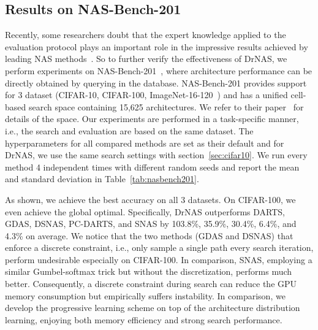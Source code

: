 \documentclass{article} \usepackage{iclr2021_conference,times}
\begin{document}
\subsection{Results on NAS-Bench-201}
\label{sec:201}
Recently, some researchers doubt that the expert knowledge applied to the evaluation protocol plays an important role in the impressive results achieved by leading NAS methods~\citep{HardEvaluation, randomnas}.
So to further verify the effectiveness of DrNAS, we perform experiments on NAS-Bench-201~\citep{nasbench201}, 
where architecture performance can be directly obtained by querying in the database.
NAS-Bench-201 provides support for 3 dataset (CIFAR-10, CIFAR-100, ImageNet-16-120~\citep{imagenet16}) and has a unified cell-based search space containing 15,625 architectures. 
We refer to their paper~\citep{nasbench201} for details of the space.
Our experiments are performed in a task-specific manner, i.e., the search and evaluation are based on the same dataset. The hyperparameters for all compared methods are set as their default and for DrNAS, we use the same search settings with section~\ref{sec:cifar10}.
We run every method 4 independent times with different random seeds and report the mean and standard deviation in Table~\ref{tab:nasbench201}.


As shown, we achieve the best accuracy on all 3 datasets. On CIFAR-100, we even achieve the global optimal. 
Specifically, DrNAS outperforms DARTS, GDAS, DSNAS, PC-DARTS, and SNAS by 103.8\%, 35.9\%, 30.4\%, 6.4\%, and 4.3\% on average. 
We notice that the two methods (GDAS and DSNAS) that enforce a discrete constraint, i.e., only sample a single path every search iteration, perform undesirable especially on CIFAR-100. 
In comparison, SNAS, employing a similar Gumbel-softmax trick but without the discretization, performs much better.
Consequently, a discrete constraint during search can reduce the GPU memory consumption but empirically suffers instability.
In comparison, we develop the progressive learning scheme on top of the architecture distribution learning, enjoying both memory efficiency and strong search performance.
\end{document}
